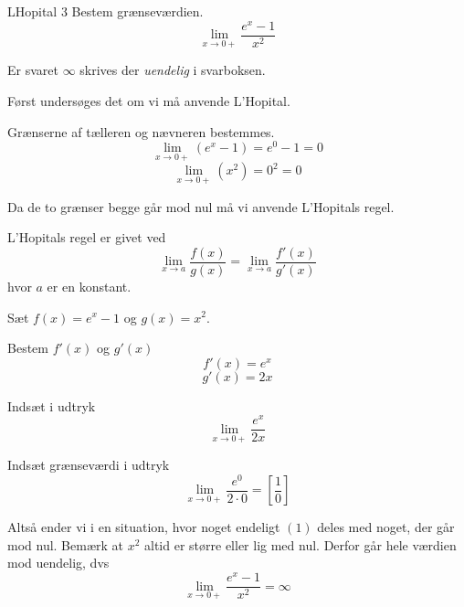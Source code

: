\documentclass{article}
\begin{document}
\begin{exercise}{LHopital 3}
Bestem grænseværdien.
\[
\lim_{x \to 0+} \frac{e^x - 1}{x^2}
\]

Er svaret $\infty$ skrives der \emph{uendelig} i svarboksen.


\hint
Først undersøges det om vi må anvende L'Hopital.

\hint
Grænserne af tælleren og nævneren bestemmes.
\[
\lim_{x \to 0+} (e^x - 1) = e^0 - 1 = 0
\]
\[
\lim_{x \to 0+} (x^2) = 0^2 = 0
\]

\hint
Da de to grænser begge går mod nul må vi anvende L'Hopitals regel.

\hint
L'Hopitals regel er givet ved
\[
\lim_{x \to a} \frac{f(x)}{g(x)} = \lim_{x \to a} \frac{f'(x)}{g'(x)}
\]
hvor $a$ er en konstant.

\hint
Sæt $f(x) = e^x - 1$ og $g(x) = x^2$.

\hint
Bestem $f'(x)$ og $g'(x)$
\[
f'(x) = e^x
\]
\[
g'(x) = 2x
\]

\hint
Indsæt i udtryk
\[
\lim_{x \to 0+} \frac{e^x}{2x}
\]

\hint
Indsæt grænseværdi i udtryk
\[
\lim_{x \to 0+} \frac{e^0}{2 \cdot 0} = \left[ \frac{1}{0} \right]
\]

\hint
Altså ender vi i en situation, hvor noget endeligt $(1)$ deles med noget, der går mod nul. Bemærk at $x^2$ altid er større eller lig med nul. Derfor går hele værdien mod uendelig, dvs
\[
\lim_{x \to 0+} \frac{e^x - 1}{x^2} = \infty
\]
\end{exercise}
\end{document}
